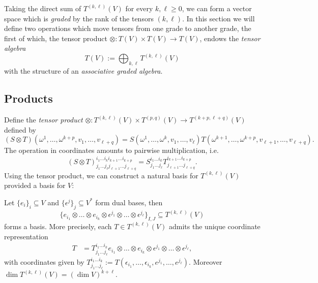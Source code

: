 Taking the direct sum of $T^{(k, \ell)} (V)$ for every $k, \ell \geq 0$, we can form a vector space which is \textit{graded} by the rank of the tensors $(k, \ell)$. In this section we will define two operations which move tensors from one grade to another grade, the first of which, the tensor product $\otimes : T(V) \times T(V) \to T(V)$, endows the \emph{tensor algebra}
	\[ T(V) := \bigoplus_{k, \ell} T^{(k, \ell)} (V) \]
with the structure of an \textit{associative graded algebra}. 	

\subsection{Products}

Define the \emph{tensor product} $\otimes : T^{(k, \ell)}(V) \times T^{(p, q)}(V) \to T^{(k + p, \ell + q)}(V)$ defined by 
	\[ (S \otimes T) (\omega^1, \dots, \omega^{k + p}, v_1, \dots, v_{\ell + q}) = S(\omega^1, \dots, \omega^k, v_1, \dots, v_\ell) T(\omega^{k + 1}, \dots, \omega^{k + p}, v_{\ell + 1}, \dots, v_{\ell + q}). \]
The operation in coordinates amounts to pairwise multiplication, i.e.
	\[ (S \otimes T)^{i_1 \dots i_k i_{k + 1} \dots i_{k + p}}_{j_1 \dots j_\ell j_{\ell + 1} \dots j_{\ell + q}} = S^{i_1 \dots i_k}_{j_1 \dots j_\ell} T^{i_{k + 1} \dots i_{k + p}}_{j_{\ell + 1} \dots j_{\ell + q}}. \]
Using the tensor product, we can construct a natural basis for $T^{(k, \ell)} (V)$ provided a basis for $V$: 	

\begin{proposition}
	Let $\{ e_i \}_i \subseteq V$ and $\{ \epsilon^j\}_j \subseteq V^*$ form dual bases, then 
		\[ \{ e_{i_1} \otimes \dots \otimes e_{i_k} \otimes \epsilon^{j_1} \otimes \dots \otimes \epsilon^{j_\ell} \}_{I, J} \subseteq T^{(k, \ell)} (V)\]
	forms a basis. More precisely, each $T \in T^{(k, \ell)} (V)$ admits the unique coordinate representation
		\begin{align*}
			T 
				&= T^{i_1\dots i_k}_{j_1 \dots j_\ell} e_{i_1} \otimes \dots \otimes e_{i_k} \otimes \epsilon^{j_1} \otimes \dots \otimes \epsilon^{j_\ell} ,
		\end{align*}
	with coordinates given by $T^{i_1\dots i_k}_{j_1 \dots j_\ell} := T(\epsilon_{i_1}, \dots , \epsilon_{i_k} ,e^{j_1} , \dots, e^{j_\ell})$. Moreover $\dim T^{(k, \ell)} (V) = (\dim V)^{k + \ell}$.
\end{proposition}

